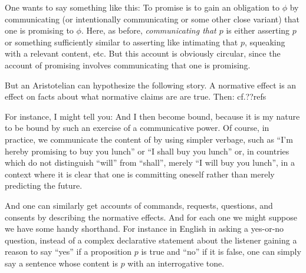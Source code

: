One wants to say something like this: To promise is to gain an obligation to 
$\phi$ by communicating (or intentionally communicating or some other close variant) that one is promising 
to $\phi$. Here, as before, \textit{communicating that $p$} is either asserting $p$ or something sufficiently similar 
to asserting like intimating that $p$, squeaking with a relevant content, etc. But this account is obviously circular, since the account of promising
involves communicating that one is promising.

But an Aristotelian can hypothesize the following story. A normative effect is an effect on facts about
what normative claims are are true. Then:
cf.??refs

For instance, I might tell you:
 And I then become bound, because it is my nature to be bound by such an exercise
of a communicative power. Of course, in practice, we communicate the content of  by using
simpler verbage, such as ``I'm hereby promising to buy you lunch'' or ``I shall buy you lunch'' or,
in countries which do not distinguish ``will'' from ``shall'', merely ``I will buy you lunch'', in a context
where it is clear that one is committing oneself rather than merely predicting the future. 

And one can similarly get accounts of commands, requests, questions, and consents by describing the normative effects.
And for each one we might suppose we have some handy shorthand. For instance in English in asking a yes-or-no question, 
instead of a complex declarative statement about the listener gaining a reason to say ``yes'' if a proposition $p$ is true
and ``no'' if it is false, one can simply say a sentence whose content is $p$ with an interrogative tone. 


